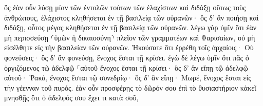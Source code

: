 \documentclass{openreader}
\begin{document}
ὃς ἐὰν οὖν λύσῃ μίαν τῶν ἐντολῶν τούτων τῶν ἐλαχίστων καὶ διδάξῃ οὕτως τοὺς ἀνθρώπους, ἐλάχιστος κληθήσεται ἐν τῇ βασιλείᾳ τῶν οὐρανῶν· ὃς δ’ ἂν ποιήσῃ καὶ διδάξῃ, οὗτος μέγας κληθήσεται ἐν τῇ βασιλείᾳ τῶν οὐρανῶν. 
λέγω γὰρ ὑμῖν ὅτι ἐὰν μὴ περισσεύσῃ ⸂ὑμῶν ἡ δικαιοσύνη⸃ πλεῖον τῶν γραμματέων καὶ Φαρισαίων, οὐ μὴ εἰσέλθητε εἰς τὴν βασιλείαν τῶν οὐρανῶν. 
Ἠκούσατε ὅτι ἐρρέθη τοῖς ἀρχαίοις· Οὐ φονεύσεις· ὃς δ’ ἂν φονεύσῃ, ἔνοχος ἔσται τῇ κρίσει. 
ἐγὼ δὲ λέγω ὑμῖν ὅτι πᾶς ὁ ὀργιζόμενος τῷ ἀδελφῷ ⸀αὐτοῦ ἔνοχος ἔσται τῇ κρίσει· ὃς δ’ ἂν εἴπῃ τῷ ἀδελφῷ αὐτοῦ· Ῥακά, ἔνοχος ἔσται τῷ συνεδρίῳ· ὃς δ’ ἂν εἴπῃ· Μωρέ, ἔνοχος ἔσται εἰς τὴν γέενναν τοῦ πυρός. 
ἐὰν οὖν προσφέρῃς τὸ δῶρόν σου ἐπὶ τὸ θυσιαστήριον κἀκεῖ μνησθῇς ὅτι ὁ ἀδελφός σου ἔχει τι κατὰ σοῦ, 
\end{document}

